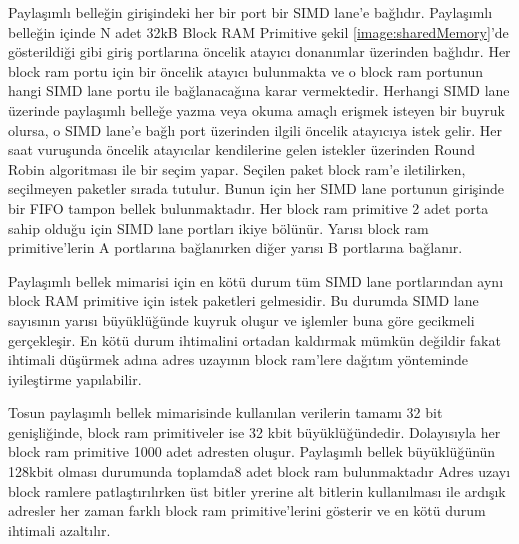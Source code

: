 Paylaşımlı belleğin girişindeki her bir port bir SIMD lane'e bağlıdır. Paylaşımlı belleğin içinde N adet 32kB Block RAM Primitive şekil \ref{image:sharedMemory}'de gösterildiği gibi giriş portlarına öncelik atayıcı donanımlar üzerinden bağlıdır. Her block ram portu için bir öncelik atayıcı bulunmakta ve o block ram portunun hangi SIMD lane portu ile bağlanacağına karar vermektedir. Herhangi SIMD lane üzerinde paylaşımlı belleğe yazma veya okuma amaçlı erişmek isteyen bir buyruk olursa, o SIMD lane'e bağlı port üzerinden ilgili öncelik atayıcıya istek gelir. Her saat vuruşunda öncelik atayıcılar kendilerine gelen istekler üzerinden Round Robin algoritması ile bir seçim yapar. Seçilen paket block ram'e iletilirken, seçilmeyen paketler sırada tutulur. Bunun için her SIMD lane portunun girişinde bir FIFO tampon bellek bulunmaktadır. Her block ram primitive 2 adet porta sahip olduğu için SIMD lane portları ikiye bölünür. Yarısı block ram primitive'lerin A portlarına bağlanırken diğer yarısı B portlarına bağlanır.\par

Paylaşımlı bellek mimarisi için en kötü durum tüm SIMD lane portlarından aynı block RAM primitive için istek paketleri gelmesidir. Bu durumda SIMD lane sayısının yarısı büyüklüğünde kuyruk oluşur ve işlemler buna göre gecikmeli gerçekleşir. En kötü durum ihtimalini ortadan kaldırmak mümkün değildir fakat ihtimali düşürmek adına adres uzayının block ram'lere dağıtım yönteminde iyileştirme yapılabilir. \par

Tosun paylaşımlı bellek mimarisinde kullanılan verilerin tamamı 32 bit genişliğinde, block ram primitiveler ise 32 kbit büyüklüğündedir. Dolayısıyla her block ram primitive 1000 adet adresten oluşur. Paylaşımlı bellek büyüklüğünün 128kbit olması durumunda toplamda8 adet block ram bulunmaktadır Adres uzayı block ramlere patlaştırılırken üst bitler yrerine alt bitlerin  
kullanılması ile ardışık adresler her zaman farklı block ram primitive'lerini gösterir ve en kötü durum ihtimali azaltılır. 

 

